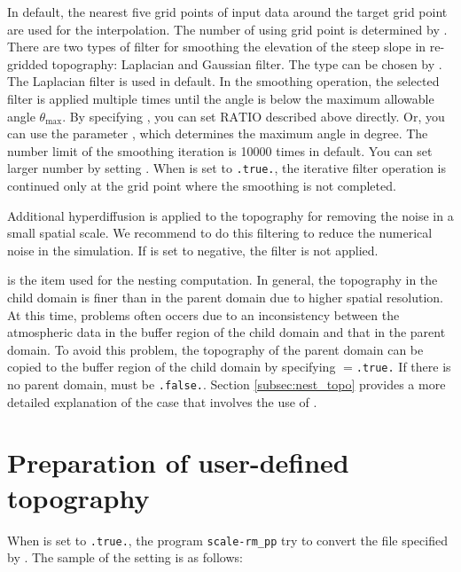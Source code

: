 In default, the nearest five grid points of input data around the target grid point are used for the interpolation. The number of using grid point is determined by .
There are two types of filter for smoothing the elevation of the steep slope in re-gridded topography: Laplacian and Gaussian filter.
The type can be chosen by . The Laplacian filter is used in default.
In the smoothing operation, the selected filter is applied multiple times until the angle is below the maximum allowable angle $\theta_{\max}$.
By specifying , you can set $\mathrm{RATIO}$ described above directly. Or, you can use the parameter , which determines the maximum angle in degree.
The number limit of the smoothing iteration is 10000 times in default. You can set larger number by setting .
When  is set to \verb|.true.|, the iterative filter operation is continued only at the grid point where the smoothing is not completed.

Additional hyperdiffusion is applied to the topography for removing the noise in a small spatial scale. We recommend to do this filtering to reduce the numerical noise in the simulation.
If  is set to negative, the filter is not applied.

 is the item used for the nesting computation.
In general, the topography in the child domain is finer than in the parent domain due to higher spatial resolution.
At this time, problems often occers due to
an inconsistency between
the atmospheric data in the buffer region of the child domain and that in the parent domain.
To avoid this problem, the topography of the parent domain can be copied to the buffer region of the child domain by specifying $=$\verb|.true.| If there is no parent domain,  must be \verb|.false.|. Section \ref{subsec:nest_topo} provides a more detailed explanation of the case that involves the use of .



\section{Preparation of user-defined topography} \label{subsec:topo_userfile}

When  is set to \verb|.true.|, the program \verb|scale-rm_pp| try to convert the file specified by .
The sample of the setting is as follows:


